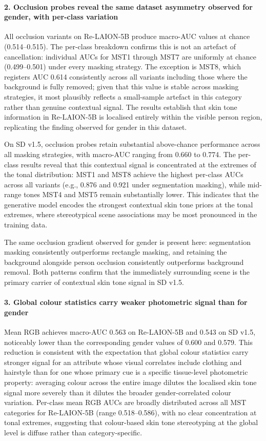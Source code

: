\paragraph{2. Occlusion probes reveal the same dataset asymmetry observed for gender,
	with per-class variation}

All occlusion variants on Re-LAION-5B produce macro-AUC values at chance (0.514--0.515).
The per-class breakdown confirms this is not an artefact of cancellation: individual
AUCs for MST1 through MST7 are uniformly at chance (0.499--0.501) under every masking
strategy. The exception is MST8, which registers AUC 0.614 consistently across all
variants including those where the background is fully removed; given that this value
is stable across masking strategies, it most plausibly reflects a small-sample artefact
in this category rather than genuine contextual signal. The results establish that skin
tone information in Re-LAION-5B is localised entirely within the visible person region,
replicating the finding observed for gender in this dataset.

On SD v1.5, occlusion probes retain substantial above-chance performance across all
masking strategies, with macro-AUC ranging from 0.660 to 0.774. The per-class results
reveal that this contextual signal is concentrated at the extremes of the tonal
distribution: MST1 and MST8 achieve the highest per-class AUCs across all variants
(e.g., 0.876 and 0.921 under segmentation masking), while mid-range tones MST4 and MST5
remain substantially lower. This indicates that the generative model encodes the strongest
contextual skin tone priors at the tonal extremes, where stereotypical scene associations
may be most pronounced in the training data.

The same occlusion gradient observed for gender is present here: segmentation masking
consistently outperforms rectangle masking, and retaining the background alongside person
occlusion consistently outperforms background removal. Both patterns confirm that the
immediately surrounding scene is the primary carrier of contextual skin tone signal in
SD v1.5.

\paragraph{3. Global colour statistics carry weaker photometric signal than for gender}

Mean RGB achieves macro-AUC 0.563 on Re-LAION-5B and 0.543 on SD v1.5, noticeably lower
than the corresponding gender values of 0.600 and 0.579. This reduction is consistent
with the expectation that global colour statistics carry stronger signal for an attribute
whose visual correlates include clothing and hairstyle than for one whose primary cue is a
specific tissue-level photometric property: averaging colour across the entire image
dilutes the localised skin tone signal more severely than it dilutes the broader
gender-correlated colour variation. Per-class mean RGB AUCs are broadly distributed
across all MST categories for Re-LAION-5B (range 0.518--0.586), with no clear
concentration at tonal extremes, suggesting that colour-based skin tone stereotyping at
the global level is diffuse rather than category-specific.

